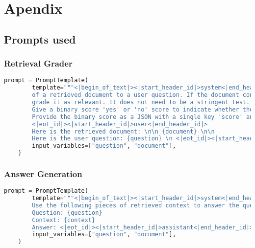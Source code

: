 \chapter*{Apendix}

\section{Prompts used}

\subsection{Retrieval Grader}

\begin{lstlisting}[language=Python, caption=\it{Prompt used for the retrieval grader.}]
    prompt = PromptTemplate(
        template="""<|begin_of_text|><|start_header_id|>system<|end_header_id|> You are a grader assessing relevance 
        of a retrieved document to a user question. If the document contains keywords related to the user question, 
        grade it as relevant. It does not need to be a stringent test. The goal is to filter out erroneous retrievals. \n
        Give a binary score 'yes' or 'no' score to indicate whether the document is relevant to the question. \n
        Provide the binary score as a JSON with a single key 'score' and no premable or explanation.
        <|eot_id|><|start_header_id|>user<|end_header_id|>
        Here is the retrieved document: \n\n {document} \n\n
        Here is the user question: {question} \n <|eot_id|><|start_header_id|>assistant<|end_header_id|>""",
        input_variables=["question", "document"],
    )
\end{lstlisting}

\subsection{Answer Generation}


\begin{lstlisting}[language=Python, caption=\it{Prompt used for answer generation.}]
    prompt = PromptTemplate(
        template="""<|begin_of_text|><|start_header_id|>system<|end_header_id|> You are an assistant for question-answering tasks. 
        Use the following pieces of retrieved context to answer the question. If you don't know the answer, just say that you don't know. <|eot_id|><|start_header_id|>user<|end_header_id|>
        Question: {question} 
        Context: {context} 
        Answer: <|eot_id|><|start_header_id|>assistant<|end_header_id|>""",
        input_variables=["question", "document"],
    )
\end{lstlisting}


